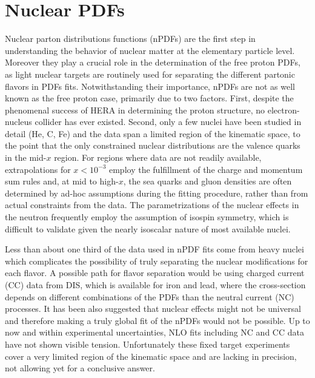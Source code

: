 
\section{Nuclear PDFs\label{sec:nPDFs}}
%
Nuclear parton distributions functions (nPDFs) are the first step in understanding the behavior of nuclear matter at the elementary particle level. Moreover they play a crucial role in the determination of the free proton PDFs, as light nuclear targets are routinely used for separating the different partonic flavors in PDFs fits. Notwithstanding their importance, nPDFs are not as well known as the free proton case, primarily due to two factors. First, despite the phenomenal success of HERA in determining the proton structure, no electron-nucleus collider has ever existed. Second, only a few nuclei have been studied in detail (He, C, Fe) and the data span a limited region of the kinematic space, to the point that the only constrained nuclear distributions are the valence quarks in the mid-$x$ region.  For regions where data are not readily available, extrapolations for $x < 10^{-3}$ employ the fulfillment of the charge and momentum sum rules and, at mid to high-$x$, the sea quarks and gluon densities are often determined by ad-hoc assumptions during the fitting procedure, rather than from actual constraints from the data.  The parametrizations of the nuclear effects in the neutron frequently employ the assumption of isospin symmetry, which is difficult to validate given the nearly isoscalar nature of most available nuclei.

Less than about one third of the data used in nPDF fits come from heavy nuclei which complicates the possibility of truly separating the nuclear modifications for each flavor. A possible path for flavor separation would be using charged current (CC) data from DIS, which is available for iron and lead, where the cross-section depends on different combinations of the PDFs than the neutral current (NC) processes. It has been also suggested that nuclear effects might not be universal and therefore making a truly global fit of the nPDFs would not be possible. Up to now and within experimental uncertainties, NLO fits including NC and CC data have not shown visible tension. Unfortunately these fixed target experiments cover a very limited region of the kinematic space and are lacking in precision, not allowing yet for a conclusive answer.


